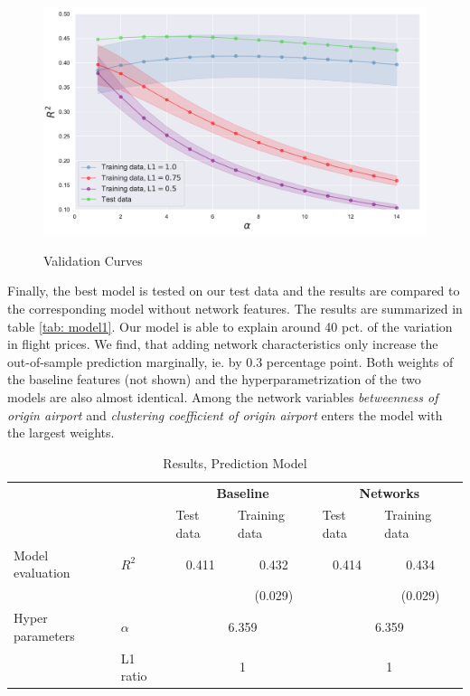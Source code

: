 \begin{figure}[H]
  \centering
  \caption{Validation Curves}
    \includegraphics[width=1. \textwidth]{Exam/Figures/validation_curve.pdf}
  \label{fig:validation curve}
\end{figure}
Finally, the best model is tested on our test data and the results are compared to the corresponding model without network features. The results are summarized in table \ref{tab: model1}. Our model is able to explain around 40 pct. of the variation in flight prices. We find, that adding network characteristics only increase the out-of-sample prediction marginally, ie. by 0.3 percentage point. Both weights of the baseline features (not shown) and the hyperparametrization of the two models are also almost identical. Among the network variables \textit{betweenness of origin airport} and \textit{clustering coefficient of origin airport} enters the model with the largest weights.   \\ 


\begin{table}[htbp]
\label{tab: model1}
  \centering
  \caption{Results, Prediction Model}
    \begin{tabular}{rlcccc}
    \hline
          &       & \multicolumn{2}{c}{\textbf{Baseline}} & \multicolumn{2}{c}{\textbf{Networks}} \\ 
          &       & \multicolumn{1}{l}{Test data} & \multicolumn{1}{l}{Training data} & \multicolumn{1}{l}{Test data} & \multicolumn{1}{l}{Training data} \\ \hline
    \multicolumn{1}{l}{Model evaluation} & $R^2$  & \multicolumn{1}{c}{0.411} & \multicolumn{1}{c}{0.432} & \multicolumn{1}{c}{0.414} & \multicolumn{1}{c}{0.434} \\
          &       &  &  \multicolumn{1}{c}{(0.029)}     &       & \multicolumn{1}{c}{(0.029)} \\
    \multicolumn{1}{l}{Hyper parameters} & $\alpha$ & \multicolumn{2}{c}{6.359} & \multicolumn{2}{c}{6.359} \\
          & L1 ratio & \multicolumn{2}{c}{1} & \multicolumn{2}{c}{1} \\ \hline
    \end{tabular}%
  \label{tab:addlabel}%
\end{table}%


